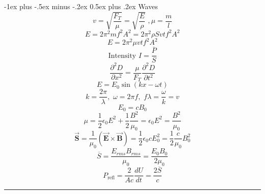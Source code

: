 \documentclass[12pt,landscape]{article}
\makeatletter
\renewcommand{\section}{\@startsection{section}{1}{0mm}%
                                {-1ex plus -.5ex minus -.2ex}%
                                {0.5ex plus .2ex}%
                                {\normalfont\large\bfseries}}
\makeatother
\begin{document}
\begin{multicols}{4}
    \section{Waves}
    \begin{equation*}
        v = \sqrt{\frac{F_T}{\mu}} = \sqrt{\frac{E}{\rho}}\,\,, \mu = \frac{m}{l}
    \end{equation*}
    \begin{equation*}
        E = 2\pi^2 m f^2 A^2 = 2\pi^2 \rho S v t f^2 A^2
    \end{equation*}
    \begin{equation*}
        E = 2 \pi^2 \mu v t f^2 A^2
    \end{equation*}
    \begin{equation*}
        \text{Intensity } I = \frac{\overbar{P}}{S}
    \end{equation*}
    \begin{equation*}
        \frac{\partial^2 D}{\partial x^2} = \frac{\mu}{F_T} \frac{\partial^2 D}{\partial t^2}
    \end{equation*}
    \begin{equation*}
        E = E_0 \sin (kx - \omega t)
    \end{equation*}
    \begin{equation*}
        k = \frac{2\pi}{\lambda}, \,\, \omega = 2\pi f,\,\, f \lambda = \frac{\omega}{k} = v
    \end{equation*}
    \begin{equation*}
        E_0 = c B_0
    \end{equation*}
    \begin{equation*}
        \mu = \frac{1}{2}\epsilon_0 E^2 + \frac{1}{2} \frac{B^2}{\mu_0} = \epsilon_0 E^2 = \frac{B^2}{\mu_0}
    \end{equation*}
    \begin{equation*}
        \vec{\mathbf{S}} = \frac{1}{\mu_0} (\vec{\mathbf{E}} \times \vec{\mathbf{B}}) = \frac{1}{2} \epsilon_0 c E_0^2 = \frac{1}{2} \frac{c}{\mu_0} B_0^2
    \end{equation*}
    \begin{equation*}
        \overbar{S} = \frac{E_{rms}B_{rms}}{\mu_0} = \frac{E_0 B_0}{2 \mu_0}
    \end{equation*}
    \begin{equation*}
        P_{\text{refl}} = \frac{2}{Ac} \frac{dU}{dt} = \frac{2 \overbar{S}}{c}
    \end{equation*}
    \rule{0.3\linewidth}{0.25pt}
    \scriptsize
    
    
\end{multicols}
\end{document}
